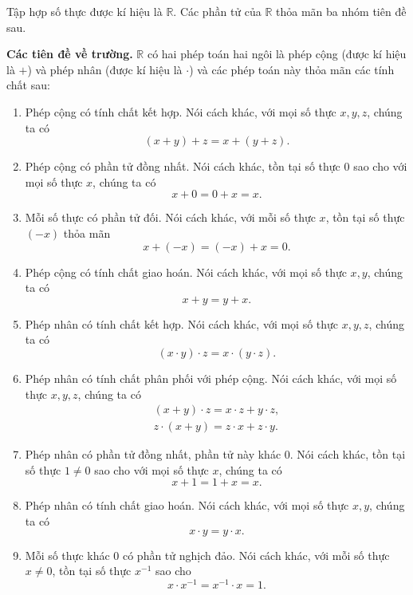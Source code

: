 \begin{axiom}
    Tập hợp số thực được kí hiệu là $\mathbb{R}$. Các phần tử của $\mathbb{R}$ thỏa mãn ba nhóm tiên đề sau.

    \textbf{Các tiên đề về trường.} $\mathbb{R}$ có hai phép toán hai ngôi là phép cộng (được kí hiệu là $+$) và phép nhân (được kí hiệu là $\cdot$) và các phép toán này thỏa mãn các tính chất sau:
    \begin{enumerate}[label={(\roman*)}]
        \item Phép cộng có tính chất kết hợp. Nói cách khác, với mọi số thực $x, y, z$, chúng ta có
              \[
                  (x + y) + z = x + (y + z).
              \]
        \item Phép cộng có phần tử đồng nhất. Nói cách khác, tồn tại số thực $0$ sao cho với mọi số thực $x$, chúng ta có
              \[
                  x + 0 = 0 + x = x.
              \]
        \item Mỗi số thực có phần tử đối. Nói cách khác, với mỗi số thực $x$, tồn tại số thực $(-x)$ thỏa mãn
              \[
                  x + (-x) = (-x) + x = 0.
              \]
        \item Phép cộng có tính chất giao hoán. Nói cách khác, với mọi số thực $x, y$, chúng ta có
              \[
                  x + y = y + x.
              \]
        \item Phép nhân có tính chất kết hợp. Nói cách khác, với mọi số thực $x, y, z$, chúng ta có
              \[
                  (x \cdot y) \cdot z = x \cdot (y \cdot z).
              \]
        \item Phép nhân có tính chất phân phối với phép cộng. Nói cách khác, với mọi số thực $x, y, z$, chúng ta có
              \[
                  \begin{split}
                      (x + y)\cdot z = x\cdot z + y\cdot z, \\
                      z\cdot (x + y) = z\cdot x + z\cdot y.
                  \end{split}
              \]

        \item Phép nhân có phần tử đồng nhất, phần tử này khác $0$. Nói cách khác, tồn tại số thực $1\ne 0$ sao cho với mọi số thực $x$, chúng ta có
              \[
                  x + 1 = 1 + x = x.
              \]
        \item Phép nhân có tính chất giao hoán. Nói cách khác, với mọi số thực $x, y$, chúng ta có
              \[
                  x\cdot y = y\cdot x.
              \]
        \item Mỗi số thực khác $0$ có phần tử nghịch đảo. Nói cách khác, với mỗi số thực $x\ne 0$, tồn tại số thực $x^{-1}$ sao cho
              \[
                  x\cdot x^{-1} = x^{-1}\cdot x = 1.
              \]
    \end{enumerate}


\end{axiom}
